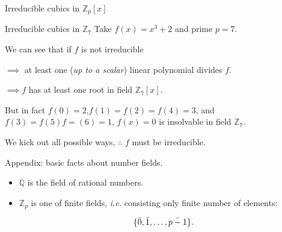 \documentclass{beamer}
\begin{document}
\begin{frame}{Irreducible cubics in $\mathbb{Z}_p[x]$}
\begin{block}{Irreducible cubics in $\mathbb{Z}_7$}
Take $f(x)= x^3+2$ and prime $p=7$.
\end{block}
We can see that if $f$ is not irreducible

$\implies$  at least one (\textit{up to a scalar}) linear polynomial divides $f$.

 $\implies$$f$ has at least one root in field $\mathbb{Z}_7[x]$.
 
 
\vspace{8pt}
But in fact $f(0)=2$,$f(1)=f(2)=f(4)=3$, and $f(3)=f(5)f=(6)=1$, $f(x)=0$ is insolvable in field $\mathbb{Z}_7$.

We kick out all possible ways, $\therefore$ $f$ must be irreducible.

\end{frame}

\begin{frame}{Appendix: basic facts about number fields.}

\begin{itemize}
    \item $\mathbb{Q}$ is the field of rational numbers.
    
    \item $\mathbb{Z}_p$ is one of finite fields, \textit{i.e.} consisting only finite number of elements:
    
    $$
    \{\Bar{0},\Bar{1},\dots,\Bar{p-1}\}.
    $$
\end{itemize}

\end{frame}
\end{document}
